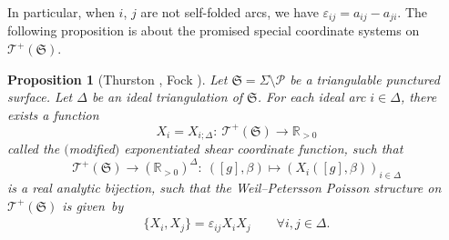 \documentclass[10pt,a4paper]{amsart}
\numberwithin{equation}{section}
\newtheorem{Proposition}[Theorem]{Proposition}
\theoremstyle{definition}
\begin{document}
In particular, when $i$, $j$ are not self-folded arcs, we have $\varepsilon_{ij} = a_{ij} - a_{ji}$.
The following proposition is about the promised special coordinate systems on $\mathscr{T}^+(\mathfrak{S})$.
\begin{Proposition}[Thurston \cite{Thurston86}, Fock \cite{F93}]\label{prop:X_i}
Let $\mathfrak{S} = \Sigma\setminus \mathcal{P}$ be a triangulable punctured surface. Let $\Delta$ be an ideal triangulation of $\mathfrak{S}$. For each ideal arc $i \in \Delta$, there exists a function
\[
X_i = X_{i;\Delta} \colon \ \mathscr{T}^+(\mathfrak{S}) \to \mathbb{R}_{>0}
\]
called the {\em $($modified$)$ exponentiated shear coordinate} function, such that
\[
\mathscr{T}^+(\mathfrak{S}) \to (\mathbb{R}_{>0})^\Delta \colon \ ([g],\beta) \mapsto (X_i([g],\beta))_{i\in \Delta}
\]
is a real analytic bijection, such that the Weil--Petersson Poisson structure on $\mathscr{T}^+(\mathfrak{S})$ is given~by
\begin{align}
\label{eq:Poisson_brackets_of_shear_coordinates}
\{X_i, X_j\} = \varepsilon_{ij} X_i X_j \qquad \forall i,j \in \Delta.
\end{align}
\end{Proposition}
\end{document}
